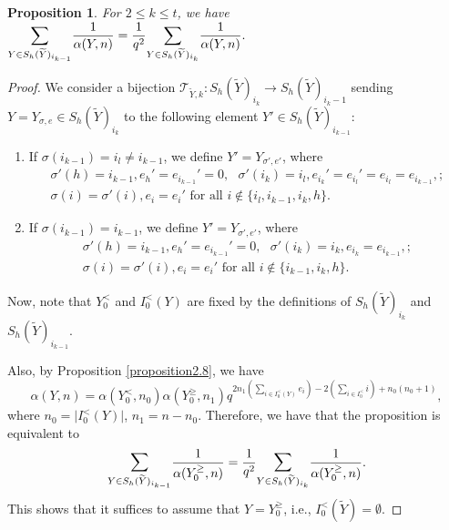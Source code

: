 \documentclass[11pt,oneside]{amsart}
\theoremstyle{plain}
\newtheorem{proposition}[theorem]{Proposition}
\theoremstyle{definition}
\theoremstyle{remark}
\newcommand{\tx}[1]{\text{#1}}
\newcommand{\CT}{{\mathcal T}}
\numberwithin{equation}{section}
\begin{document}
	\begin{proposition}\label{proposition2.13} For $2 \leq k \leq t$, we have
		$
		\mathlarger{\sum}_{Y \in S_h(\widetilde{Y})_{i_{k-1}}} \dfrac{1}{\alpha(Y,n)}=\dfrac{1}{q^2}\mathlarger{\sum}_{Y \in S_h(\widetilde{Y})_{i_{k}}} \dfrac{1}{\alpha(Y,n)}.
		$
	\end{proposition}
	\begin{proof}
		We consider a bijection $\CT_{\widetilde{Y},k}:S_h(\widetilde{Y})_{i_k} \rightarrow S_h(\widetilde{Y})_{i_k-1}$ sending $Y=Y_{\sigma,e} \in S_h(\widetilde{Y})_{i_k}$ to the following element $Y' \in S_h(\widetilde{Y})_{i_{k-1}}$:
		
		\begin{enumerate}
			\item If $\sigma(i_{k-1})=i_l \neq i_{k-1}$, we define $Y'=Y_{\sigma', e'}$, where
			\begin{equation*}\begin{array}{l}
					\sigma'(h)=i_{k-1}, e_h'=e_{i_{k-1}}'=0,\tx{ }
					\sigma'(i_k)=i_l, e_{i_k}'=e_{i_l}'=e_{i_l}=e_{i_{k-1}},;\\
					\sigma(i)=\sigma'(i), e_i=e_i' \text{ for all } i \notin \lbrace i_l,i_{k-1},i_k,h\rbrace.
				\end{array}
			\end{equation*}
			
			\item If $\sigma(i_{k-1})=i_{k-1}$, we define $Y'=Y_{\sigma', e'}$, where
			\begin{equation*}\begin{array}{l}
					\sigma'(h)=i_{k-1}, e_h'=e_{i_{k-1}}'=0,\tx{ }
					\sigma'(i_k)=i_k, e_{i_k}=e_{i_{k-1}},;\\
					\sigma(i)=\sigma'(i), e_i=e_i' \text{ for all } i \notin \lbrace i_{k-1},i_k,h\rbrace.
				\end{array}
			\end{equation*}
		\end{enumerate}
		
		Now, note that $Y_0^<$ and $I_0^<(Y)$ are fixed by the definitions of $S_h(\widetilde{Y})_{i_k}$ and $S_h(\widetilde{Y})_{i_{k-1}}$.
		
		Also, by Proposition \ref{proposition2.8}, we have
		\begin{equation*}
			\alpha(Y,n)=\alpha(Y^{<}_0,n_0)\alpha(Y^{\geq}_0,n_1)q^{2n_1(\sum_{i \in I_0^{<}(Y)}e_i)-2(\sum_{i \in I_0^{<}} i)+n_0(n_0+1)},
		\end{equation*}
		where $n_0=\vert I_0^<(Y) \vert$, $n_1=n-n_0$. Therefore, we have that the proposition is equivalent to
		\begin{equation*}
			\mathlarger{\sum}_{Y \in S_h(\widetilde{Y})_{i_{k-1}}} \dfrac{1}{\alpha(Y_0^{\geq},n)}=\dfrac{1}{q^2}\mathlarger{\sum}_{Y \in S_h(\widetilde{Y})_{i_{k}}} \dfrac{1}{\alpha(Y_0^{\geq},n)}.
		\end{equation*}
		This shows that it suffices to assume that $Y=Y_0^{\geq}$, i.e., $I_0^{<}(\widetilde{Y})=\emptyset$.
		

\end{proof}
\end{document}
